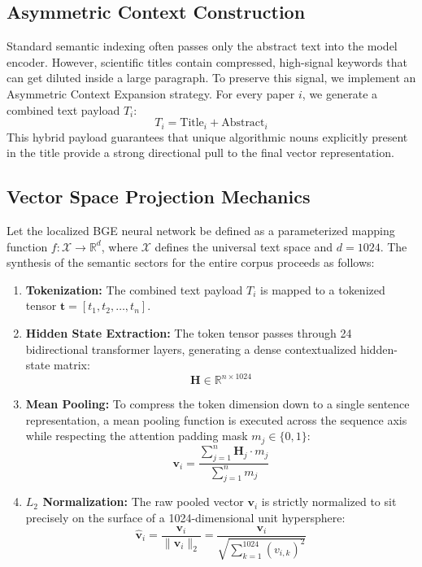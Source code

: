 \documentclass[12pt,a4paper]{article}
\begin{document}
\subsection{Asymmetric Context Construction}
Standard semantic indexing often passes only the abstract text into the model encoder. However, scientific titles contain compressed, high-signal keywords that can get diluted inside a large paragraph. To preserve this signal, we implement an Asymmetric Context Expansion strategy. For every paper $i$, we generate a combined text payload $T_i$:
\begin{equation}
    T_i = \text{Title}_i + \text{Abstract}_i
\end{equation}
This hybrid payload guarantees that unique algorithmic nouns explicitly present in the title provide a strong directional pull to the final vector representation.

\subsection{Vector Space Projection Mechanics}
Let the localized BGE neural network be defined as a parameterized mapping function $f: \mathcal{X} \to \mathbb{R}^d$, where $\mathcal{X}$ defines the universal text space and $d = 1024$. The synthesis of the semantic sectors for the entire corpus proceeds as follows:

\begin{enumerate}
    \item \textbf{Tokenization:} The combined text payload $T_i$ is mapped to a tokenized tensor $\mathbf{t} = [t_1, t_2, \dots, t_n]$.
    \item \textbf{Hidden State Extraction:} The token tensor passes through 24 bidirectional transformer layers, generating a dense contextualized hidden-state matrix:
    \begin{equation}
        \mathbf{H} \in \mathbb{R}^{n \times 1024}
    \end{equation}
    \item \textbf{Mean Pooling:} To compress the token dimension down to a single sentence representation, a mean pooling function is executed across the sequence axis while respecting the attention padding mask $m_j \in \{0, 1\}$:
    \begin{equation}
        \mathbf{v}_i = \frac{\sum_{j=1}^{n} \mathbf{H}_j \cdot m_j}{\sum_{j=1}^{n} m_j}
    \end{equation}
    \item \textbf{$L_2$ Normalization:} The raw pooled vector $\mathbf{v}_i$ is strictly normalized to sit precisely on the surface of a 1024-dimensional unit hypersphere:
    \begin{equation}
        \hat{\mathbf{v}}_i = \frac{\mathbf{v}_i}{\|\mathbf{v}_i\|_2} = \frac{\mathbf{v}_i}{\sqrt{\sum_{k=1}^{1024} (v_{i,k})^2}}
    \end{equation}
\end{enumerate}
\end{document}
